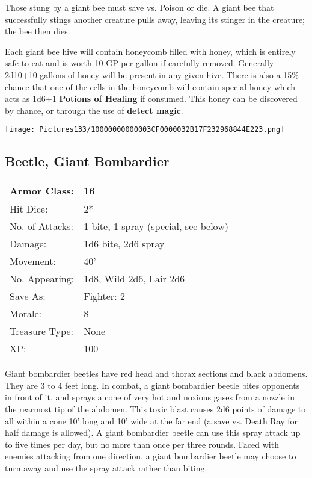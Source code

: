 \documentclass[a4paper,twoside,openany,10pt]{book}
\begin{document}
\begin{multicols}{2}
Those stung by a giant bee must save vs. Poison or die. A giant bee that successfully stings another creature pulls away, leaving its stinger in the creature; the bee then dies.

Each giant bee hive will contain honeycomb filled with honey, which is entirely safe to eat and is worth 10 GP per gallon if carefully removed. Generally 2d10+10 gallons of honey will be present in any given hive. There is also a 15\% chance that one of the cells in the honeycomb will contain special honey which acts as 1d6+1 \textbf{Potions of Healing} if consumed. This honey can be discovered by chance, or through the use of \textbf{detect magic}.

\begin{center}
	\texttt{[image: Pictures133/10000000000003CF0000032B17F232968844E223.png]}
\end{center}

\subsection*{Beetle, Giant Bombardier}\label{beetle-giant-bombardier}

\begin{tabularx}{0.48\textwidth}{@{}lX@{}}
Armor Class: & 16 \\\hline
Hit Dice: & 2* \\\hline
No. of Attacks: & 1 bite, 1 spray (special, see below) \\\hline
Damage: & 1d6 bite, 2d6 spray \\\hline
Movement: & 40' \\\hline
No. Appearing: & 1d8, Wild 2d6, Lair 2d6 \\\hline
Save As: & Fighter: 2 \\\hline
Morale: & 8 \\\hline
Treasure Type: & None \\\hline
XP: & 100 \\\hline
\end{tabularx}\medskip

Giant bombardier beetles have red head and thorax sections and black abdomens. They are 3 to 4 feet long. In combat, a giant bombardier beetle bites opponents in front of it, and sprays a cone of very hot and noxious gases from a nozzle in the rearmost tip of the abdomen. This toxic blast causes 2d6 points of damage to all within a cone 10' long and 10' wide at the far end (a save vs. Death Ray for half damage is allowed). A giant bombardier beetle can use this spray attack up to five times per day, but no more than once per three rounds. Faced with enemies attacking from one direction, a giant bombardier beetle may choose to turn away and use the spray attack rather than biting. 


\end{multicols}
\end{document}
